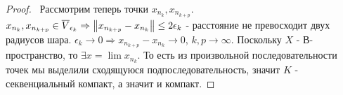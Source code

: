 \begin{proof}
\smallskip
\noindent\textbullet~Рассмотрим теперь точки $x_{n_k}, x_{n_{k + p}}$. $x_{n_k}, x_{n_{k + p}} \in \overline{V}_{\epsilon_k} \Rightarrow \left\lVert x_{n_{k + p}} - x_{n_k}\right\rVert \le
2 \epsilon_k$ - расстояние не превосходит двух радиусов шара. $\epsilon_k \to 0 \Rightarrow x_{n_{k + p}} - x_{n_k} \to 0$, $k, p \to \infty$. Поскольку $X$ - В-пространство, то $\exists x = \lim x_{n_k}$. То есть из произвольной последовательности точек мы выделили сходящуюся подпоследовательность, значит $K$ - секвенциальный 
компакт, а значит и компакт.
\end{proof}